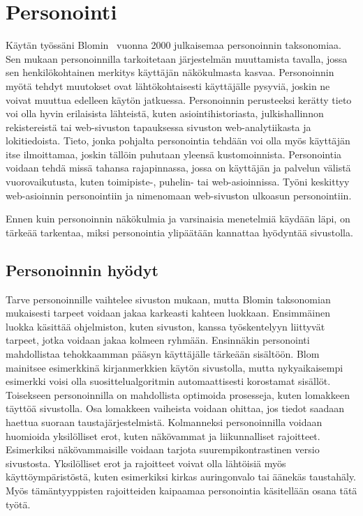 \documentclass[finnish, 12pt, a4paper, elec, utf8, a-1b, online]{aaltothesis}
\begin{document}
\section{Personointi}\label{personalization}

Käytän työssäni Blomin~\cite{10.1145/633292.633483} vuonna 2000 julkaisemaa
personoinnin taksonomiaa. Sen mukaan personoinnilla tarkoitetaan järjestelmän
muuttamista tavalla, jossa sen henkilökohtainen merkitys käyttäjän näkökulmasta
kasvaa. Personoinnin myötä tehdyt muutokset ovat lähtökohtaisesti käyttäjälle
pysyviä, joskin ne voivat muuttua edelleen käytön jatkuessa. Personoinnin
perusteeksi kerätty tieto voi olla hyvin erilaisista lähteistä, kuten
asiointihistoriasta, julkishallinnon rekistereistä tai web-sivuston tapauksessa
sivuston web-analytiikasta ja lokitiedoista. Tieto, jonka pohjalta personointia
tehdään voi olla myös käyttäjän itse ilmoittamaa, joskin tällöin puhutaan
yleensä kustomoinnista. Personointia voidaan tehdä missä tahansa rajapinnassa,
jossa on käyttäjän ja palvelun välistä vuorovaikutusta, kuten toimipiste-,
puhelin- tai web-asioinnissa. Työni keskittyy web-asioinnin personointiin ja
nimenomaan web-sivuston ulkoasun personointiin.

Ennen kuin personoinnin näkökulmia ja varsinaisia menetelmiä käydään läpi, on
tärkeää tarkentaa, miksi personointia ylipäätään kannattaa hyödyntää
sivustolla.

\subsection{Personoinnin hyödyt}\label{personalization-pros}

Tarve personoinnille vaihtelee sivuston mukaan, mutta Blomin taksonomian
mukaisesti tarpeet voidaan jakaa karkeasti kahteen luokkaan. Ensimmäinen luokka
käsittää ohjelmiston, kuten sivuston, kanssa työskentelyyn liittyvät tarpeet,
jotka voidaan jakaa kolmeen ryhmään. Ensinnäkin personointi mahdollistaa
tehokkaamman pääsyn käyttäjälle tärkeään sisältöön. Blom mainitsee esimerkkinä
kirjanmerkkien käytön sivustolla, mutta nykyaikaisempi esimerkki voisi olla
suosittelualgoritmin automaattisesti korostamat sisällöt. Toisekseen
personoinnilla on mahdollista optimoida prosesseja, kuten lomakkeen täyttöä
sivustolla. Osa lomakkeen vaiheista voidaan ohittaa, jos tiedot saadaan haettua
suoraan taustajärjestelmistä. Kolmanneksi personoinnilla voidaan huomioida
yksilölliset erot, kuten näkövammat ja liikunnalliset rajoitteet. Esimerkiksi
näkövammaisille voidaan tarjota suurempikontrastinen versio sivustosta.
Yksilölliset erot ja rajoitteet voivat olla lähtöisiä myös käyttöympäristöstä,
kuten esimerkiksi kirkas auringonvalo tai äänekäs taustahäly. Myös
tämäntyyppisten rajoitteiden kaipaamaa personointia käsitellään osana tätä
työtä.
\end{document}
